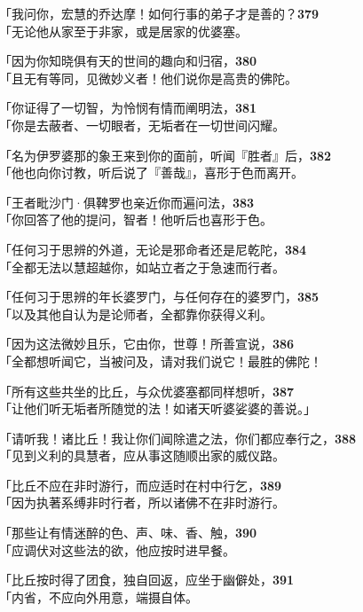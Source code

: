 「我问你，宏慧的乔达摩！如何行事的弟子才是善的？\hfill{\grayfootnotesize \textbf{379}} \\
「无论他从家至于非家，或是居家的优婆塞。


「因为你知晓俱有天的世间的趣向和归宿，\hfill{\grayfootnotesize \textbf{380}} \\
「且无有等同，见微妙义者！他们说你是高贵的佛陀。


「你证得了一切智，为怜悯有情而阐明法，\hfill{\grayfootnotesize \textbf{381}} \\
「你是去蔽者、一切眼者，无垢者在一切世间闪耀。


「名为伊罗婆那的象王来到你的面前，听闻『胜者』后，\hfill{\grayfootnotesize \textbf{382}} \\
「他也向你讨教，听后说了『善哉』，喜形于色而离开。


「王者毗沙门·俱鞞罗也亲近你而遍问法，\hfill{\grayfootnotesize \textbf{383}} \\
「你回答了他的提问，智者！他听后也喜形于色。


「任何习于思辨的外道，无论是邪命者还是尼乾陀，\hfill{\grayfootnotesize \textbf{384}} \\
「全都无法以慧超越你，如站立者之于急速而行者。


「任何习于思辨的年长婆罗门，与任何存在的婆罗门，\hfill{\grayfootnotesize \textbf{385}} \\
「以及其他自认为是论师者，全都靠你获得义利。


「因为这法微妙且乐，它由你，世尊！所善宣说，\hfill{\grayfootnotesize \textbf{386}} \\
「全都想听闻它，当被问及，请对我们说它！最胜的佛陀！


「所有这些共坐的比丘，与众优婆塞都同样想听，\hfill{\grayfootnotesize \textbf{387}} \\
「让他们听无垢者所随觉的法！如诸天听婆娑婆的善说。」


「请听我！诸比丘！我让你们闻除遣之法，你们都应奉行之，\hfill{\grayfootnotesize \textbf{388}} \\
「见到义利的具慧者，应从事这随顺出家的威仪路。


「比丘不应在非时游行，而应适时在村中行乞，\hfill{\grayfootnotesize \textbf{389}} \\
「因为执著系缚非时行者，所以诸佛不在非时游行。


「那些让有情迷醉的色、声、味、香、触，\hfill{\grayfootnotesize \textbf{390}} \\
「应调伏对这些法的欲，他应按时进早餐。


「比丘按时得了团食，独自回返，应坐于幽僻处，\hfill{\grayfootnotesize \textbf{391}} \\
「内省，不应向外用意，端摄自体。


